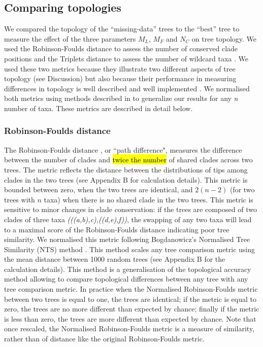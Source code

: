 \documentclass[12pt,letterpaper]{article}
\begin{document}
\subsection{Comparing topologies}
We compared the topology of the ``missing-data'' trees to the ``best'' tree to measure the effect of the three parameters $M_{L}$, $M_{F}$ and $N_{C}$ on tree topology.
We used the Robinson-Foulds distance \citep{RF1981} to assess the number of conserved clade positions and the Triplets distance \citep{dobson1975triplets} to assess the number of wildcard taxa \citep[i.e. taxa that frequently change position in different trees][]{kearneyfragmentary2002}. We used these two metrics because they illustrate two different aspects of tree topology (see Discussion) but also because their performance in measuring differences in topology is well described \citep{Kuhner04112014} and well implemented \citep{Bogdanowicz2012}.
We normalised both metrics using methods described in \citet{Bogdanowicz2012} to generalize our results for any \textit{n} number of taxa.
These metrics are described in detail below.

\subsubsection{Robinson-Foulds distance}
The Robinson-Foulds distance \citep{RF1981}, or ``path difference", measures the difference between the number of clades and \hl{twice the number} of shared clades across two trees.
The metric reflects the distance between the distributions of tips among clades in the two trees \citep{RF1981} (see Appendix B for calculation details).
This metric is bounded between zero, when the two trees are identical, and $2(n-2)$ (for two trees with $n$ taxa) when there is no shared clade in the two trees.
This metric is sensitive to minor changes in clade conservation: if the trees are composed of two clades of three taxa \textit{(((a,b),c),((d,e),f))}, the swapping of any two taxa will lead to a maximal score of the Robinson-Foulds distance indicating poor tree similarity.
We normalised this metric following Bogdanowicz's Normalised Tree Similarity (NTS) method \citep{Bogdanowicz2012}.
This method scales any tree comparison metric using the mean distance between 1000 random trees (see Appendix B for the calculation details).
This method is a generalisation of the topological accuracy method \citep{Price2010} allowing to compare topological differences between any tree with any tree comparison metric.
In practice when the Normalised Robinson-Foulds metric between two trees is equal to one, the trees are identical; if the metric is equal to zero, the trees are no more different than expected by chance; finally if the metric is less than zero, the trees are more different than expected by chance.
Note that once rescaled, the Normalised Robinson-Foulds metric is a measure of similarity, rather than of distance like the original Robinson-Foulds metric. 
\end{document}
